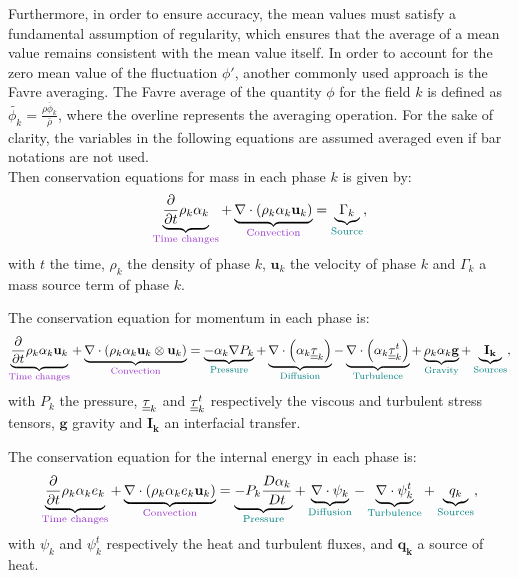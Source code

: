 Furthermore, in order to ensure accuracy, the mean values must satisfy a fundamental assumption of regularity, which ensures that the average of a mean value remains consistent with the mean value itself. In order to account for the zero mean value of the fluctuation $\phi'$, another commonly used approach is the Favre averaging. The Favre average of the quantity $\phi$ for the field $k$ is defined as $\tilde{\phi_k}=\frac{\overline{\rho\phi_k}}{\bar{\rho}}$, where the overline represents the averaging operation.
For the sake of clarity, the variables in the following equations are assumed averaged even if bar notations are not used. \\
Then conservation equations for mass in each phase $k$ is given by: 
\begin{equation}\label{base1:1}
\underbrace{\frac{\partial}{\partial t}\rho_k\alpha_k}_{\color{mydarkorchid}\text{Time changes}}+\underbrace{\nabla\cdot\parent{\rho_k\alpha_k\mathbf{u}_k}}_{\color{mydarkorchid} \text{Convection}}=\underbrace{\Gamma_k}_{\color{myteal}\text{Source}},
\end{equation}
with $t$ the time, $\rho_k$ the density of phase $k$, $\mathbf{u}_k$ the velocity of phase $k$ and $\Gamma_k$ a mass source term of phase $k$.

The conservation equation for momentum in each phase is:
\begin{equation}\label{base2:1}
\underbrace{\frac{\partial}{\partial t}\rho_k\alpha_k \mathbf{u}_k}_{\color{mydarkorchid}\text{Time  changes}}+\underbrace{\nabla\cdot\parent{\rho_k\alpha_k \mathbf{u}_k \otimes \mathbf{u}_k}}_{\color{mydarkorchid}\text{Convection}}=\underbrace{-\alpha_k\nabla P_k}_{\color{myteal}\text{Pressure}}+\underbrace{\nabla \cdot \parent{\alpha_k\ull{\tau}_k}
}_{\color{myteal}\text{Diffusion}}-\underbrace{\nabla \cdot \parent{\alpha_k\ull{\tau}^t_k}
}_{\color{myteal}\text{Turbulence}}+\underbrace{\rho_k\alpha_k \mathbf{g}}_{\color{myteal} \text{Gravity}}+\underbrace{\mathbf{I_k}}_{\color{myteal}\text{Sources}},
\end{equation}
with $P_k$ the pressure, $\underline{\underline{\tau}}_k$ and $\underline{\underline{\tau}}^t_k$ respectively the viscous and turbulent stress tensors, $\mathbf{g}$ gravity and $\mathbf{I_k}$ an interfacial transfer.

The conservation equation for the internal energy in each phase is:
\begin{equation}\label{base2:2}
\underbrace{\frac{\partial}{\partial t}\rho_k\alpha_k  e_k}_{\color{mydarkorchid}\text{Time changes}}+\underbrace{\nabla\cdot\parent{\rho_k\alpha_k  e_k \mathbf{u}_k}}_{\color{mydarkorchid} \text{Convection}}=\underbrace{-P_k\frac{D\alpha_k}{Dt}}_{\color{myteal}\text{Pressure}}+\underbrace{\nabla \cdot {\psi}_k
}_{\color{myteal}\text{Diffusion}}-\underbrace{\nabla \cdot {\psi}^t_k
}_{\color{myteal}\text{Turbulence}}+\underbrace{ {q_k}}_{\color{myteal}\text{Sources}},
\end{equation}
with  $\psi_k$ and $\psi^t_k$ respectively the heat and turbulent fluxes, and $\mathbf{q_k}$ a source of heat.

